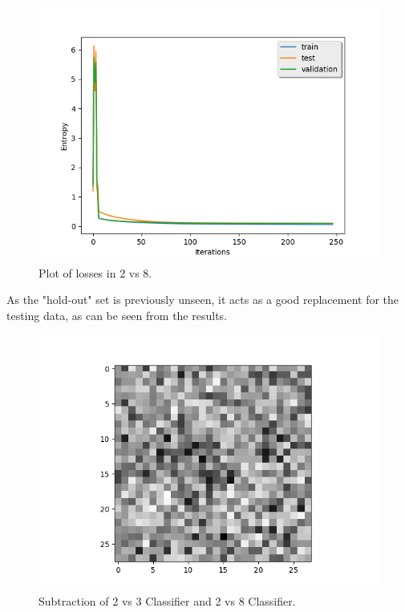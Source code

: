\documentclass{article} %
\begin{document}
\begin{figure}[H]
\begin{center}
\includegraphics[width=0.8\linewidth]{plt_2vs8_losses.png}
\end{center}
\caption{Plot of losses in 2 vs 8.}
\end{figure}
As the "hold-out" set is previously unseen, it acts as a good replacement for the testing data, as can be seen from the results.
\begin{figure}[H]
\begin{center}
\includegraphics[width=0.8\linewidth]{2vs3-2vs8.png}
\end{center}
\caption{Subtraction of 2 vs 3 Classifier and 2 vs 8 Classifier.}
\end{figure}
\end{document}
